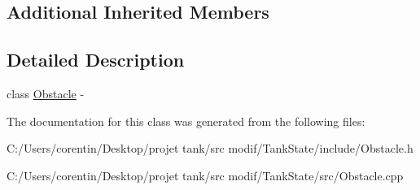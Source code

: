 \subsection*{Additional Inherited Members}


\subsection{Detailed Description}
class \hyperlink{classstate_1_1_obstacle}{Obstacle} -\/ 

The documentation for this class was generated from the following files\+:\begin{DoxyCompactItemize}
\item 
C\+:/\+Users/corentin/\+Desktop/projet tank/src modif/\+Tank\+State/include/Obstacle.\+h\item 
C\+:/\+Users/corentin/\+Desktop/projet tank/src modif/\+Tank\+State/src/Obstacle.\+cpp\end{DoxyCompactItemize}
